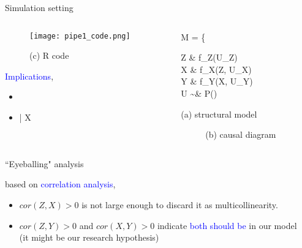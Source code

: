 %
%
\begin{frame}
	{Simulation setting}
	\begin{columns}
		\begin{column}{0.5\textwidth}
			\begin{figure}
				\texttt{[image: pipe1\_code.png]}
				\caption*{(c) R code}
			\end{figure}
			\textcolor{blue}{Implications},
			\begin{itemize}
				\item {} \\
				\item {} \; | X
			\end{itemize}
		\end{column}
		\begin{column}{0.5\textwidth}  
			\begin{equ}
				M = \left\{ \begin{aligned} 
					Z \leftarrow & \; f_{Z}(U_{Z}) \\
					X \leftarrow & \; f_{X}(Z, U_{X}) \\
					Y \leftarrow & \; f_{Y}(X, U_{Y}) \\
					U \sim & \; P()
				\end{aligned} \right
				\caption*{(a) structural model}
			\end{equ}
			\begin{figure}
				\caption*{(b) causal diagram}
			\end{figure}
		\end{column}
	\end{columns}
\end{frame}
%
%
\begin{lhframe}[rhgraphic={\texttt{[image: pipe1\_panel.pdf]}}]
	{``Eyeballing" analysis}
	
	based on \textcolor{blue}{correlation analysis},
	\begin{itemize}
		\item $cor(Z, X)>0$ is not large enough to discard it as multicollinearity.
		\item $cor(Z, Y)>0$ and $cor(X, Y)>0$ indicate \textcolor{blue}{both should be} in our model \\
		{\small (it might be our research hypothesis)}
	\end{itemize}
\end{lhframe}
